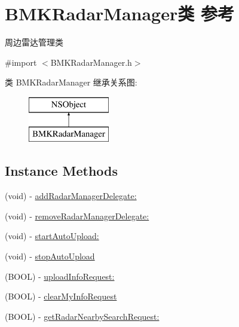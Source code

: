 \hypertarget{interface_b_m_k_radar_manager}{}\section{B\+M\+K\+Radar\+Manager类 参考}
\label{interface_b_m_k_radar_manager}


周边雷达管理类  




{\ttfamily \#import $<$B\+M\+K\+Radar\+Manager.\+h$>$}

类 B\+M\+K\+Radar\+Manager 继承关系图\+:\begin{figure}[H]
\begin{center}
\leavevmode
\includegraphics[height=2.000000cm]{interface_b_m_k_radar_manager}
\end{center}
\end{figure}
\subsection*{Instance Methods}
\begin{DoxyCompactItemize}
\item 
(void) -\/ \hyperlink{interface_b_m_k_radar_manager_a82396fd5134572b965e2afb39c592a48}{add\+Radar\+Manager\+Delegate\+:}
\item 
(void) -\/ \hyperlink{interface_b_m_k_radar_manager_ab51759bad027336663405007a3e94270}{remove\+Radar\+Manager\+Delegate\+:}
\item 
(void) -\/ \hyperlink{interface_b_m_k_radar_manager_a8cb06af226279c61db227d5bce3dc556}{start\+Auto\+Upload\+:}
\item 
(void) -\/ \hyperlink{interface_b_m_k_radar_manager_ac395c3231883b88ac71a2b04966a6957}{stop\+Auto\+Upload}
\item 
(B\+O\+O\+L) -\/ \hyperlink{interface_b_m_k_radar_manager_ab541d1e8b6d5cc2dcb49edd6458907c1}{upload\+Info\+Request\+:}
\item 
(B\+O\+O\+L) -\/ \hyperlink{interface_b_m_k_radar_manager_a42a4b96b039cea3c1f527298b4088996}{clear\+My\+Info\+Request}
\item 
(B\+O\+O\+L) -\/ \hyperlink{interface_b_m_k_radar_manager_adc64446a16d2f878c94a6a7b3606af12}{get\+Radar\+Nearby\+Search\+Request\+:}
\end{DoxyCompactItemize}
